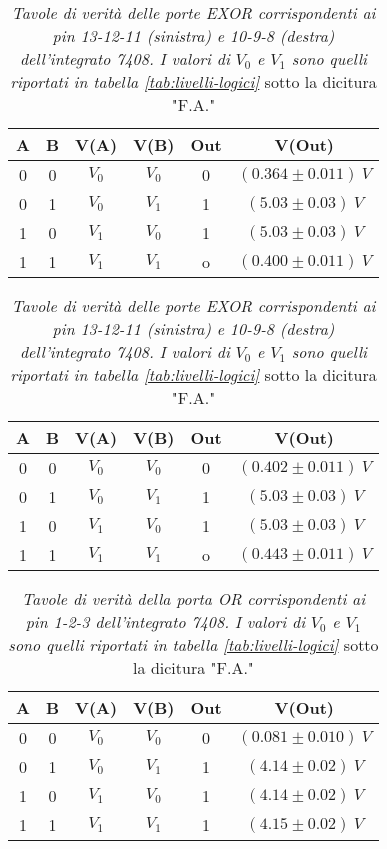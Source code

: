 \begin{table}[H]
  \centering
  \begin{subtable}[c]{0.5\textwidth}
    \centering
    \begin{tabular}[t]{c  c | c  c | c  c}
      \hline
      A & B & V(A) & V(B) & Out & V(Out) \\
      \hline
      0 & 0 & $V_{0}$ & $V_{0}$ & 0 & $(0.364 \pm 0.011) \: V$ \\
      0 & 1 & $V_{0}$ & $V_{1}$ & 1 & $(5.03 \pm 0.03) \: V$ \\
      1 & 0 & $V_{1}$ & $V_{0}$ & 1 & $(5.03 \pm 0.03) \: V$ \\
      1 & 1 & $V_{1}$ & $V_{1}$ & o & $(0.400 \pm 0.011) \: V$ \\
      \hline
    \end{tabular}
  \end{subtable}
  \begin{subtable}[c]{0.5\textwidth}
    \centering
    \begin{tabular}[t]{c  c | c  c | c  c}
      \hline
      A & B & V(A) & V(B) & Out & V(Out) \\
      \hline
      0 & 0 & $V_{0}$ & $V_{0}$ & 0 & $(0.402 \pm 0.011) \: V$ \\
      0 & 1 & $V_{0}$ & $V_{1}$ & 1 & $(5.03 \pm 0.03) \: V$ \\
      1 & 0 & $V_{1}$ & $V_{0}$ & 1 & $(5.03 \pm 0.03) \: V$ \\
      1 & 1 & $V_{1}$ & $V_{1}$ & o & $(0.443 \pm 0.011) \: V$ \\
      \hline
    \end{tabular}
  \end{subtable}
  \caption{\emph{Tavole di verità delle porte \emph{EXOR} corrispondenti ai pin 13-12-11 (sinistra) e 10-9-8 (destra) dell'integrato 7408. I valori di $V_{0}$ e $V_{1}$ sono quelli riportati in tabella \ref{tab:livelli-logici}} sotto la dicitura "F.A."}
  \label{tab:exor-fulladder}
\end{table}

\begin{table}[H]
  \centering
  \begin{tabular}[t]{c  c | c  c | c  c}
    \hline
    A & B & V(A) & V(B) & Out & V(Out) \\
    \hline
    0 & 0 & $V_{0}$ & $V_{0}$ & 0 & $(0.081 \pm 0.010) \: V$ \\
    0 & 1 & $V_{0}$ & $V_{1}$ & 1 & $(4.14 \pm 0.02) \: V$ \\
    1 & 0 & $V_{1}$ & $V_{0}$ & 1 & $(4.14 \pm 0.02) \: V$ \\
    1 & 1 & $V_{1}$ & $V_{1}$ & 1 & $(4.15 \pm 0.02) \: V$ \\
    \hline
  \end{tabular}
  \caption{\emph{Tavole di verità della porta \emph{OR} corrispondenti ai pin 1-2-3 dell'integrato 7408. I valori di $V_{0}$ e $V_{1}$ sono quelli riportati in tabella \ref{tab:livelli-logici}} sotto la dicitura "F.A."}
  \label{tab:or-fulladder}
\end{table}

